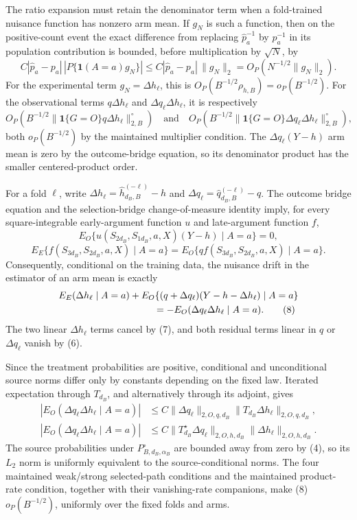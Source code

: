 The ratio expansion must retain the denominator term when a fold-trained nuisance function has nonzero arm mean.  If \(g_N\) is such a function, then on the positive-count event the exact difference from replacing \(\widehat p_a^{-1}\) by \(p_a^{-1}\) in its population contribution is bounded, before multiplication by \(\sqrt N\), by
\[
 C|\widehat p_a-p_a|\,|P\{\mathbf1(A=a)g_N\}|
 \le C|\widehat p_a-p_a|\,\|g_N\|_2
 =O_P(N^{-1/2}\|g_N\|_2). \tag{5a}
\]
For the experimental term \(g_N=\Delta h_\ell\), this is \(O_P(B^{-1/2}\rho_{h,B})=o_P(B^{-1/2})\).  For the observational terms \(q\Delta h_\ell\) and \(\Delta q_\ell\Delta h_\ell\), it is respectively
\[
 O_P\!\left(B^{-1/2}\|\mathbf1\{G=O\}q\Delta h_\ell\|_{2,B}^{\circ}\right)
 \quad\text{and}\quad
 O_P\!\left(B^{-1/2}\|\mathbf1\{G=O\}\Delta q_\ell\Delta h_\ell\|_{2,B}^{\circ}\right), \tag{5b}
\]
both \(o_P(B^{-1/2})\) by the maintained multiplier condition.  The \(\Delta q_\ell(Y-h)\) arm mean is zero by the outcome-bridge equation, so its denominator product has the smaller centered-product order.

For a fold \(\ell\), write \(\Delta h_\ell=\widehat h_{d_B,B}^{(-\ell)}-h\) and \(\Delta q_\ell=\widehat q_{d_B,B}^{(-\ell)}-q\).  The outcome bridge equation and the selection-bridge change-of-measure identity imply, for every square-integrable early-argument function \(u\) and late-argument function \(f\),
\[
 E_O\{u(S_{2d_B},S_{1d_B},a,X)(Y-h)\mid A=a\}=0, \tag{6}
\]
\[
 E_E\{f(S_{3d_B},S_{2d_B},a,X)\mid A=a\}
 =E_O\{q f(S_{3d_B},S_{2d_B},a,X)\mid A=a\}. \tag{7}
\]
Consequently, conditional on the training data, the nuisance drift in the estimator of an arm mean is exactly
\[
\begin{aligned}
 &E_E(\Delta h_\ell\mid A=a)
 +E_O\{(q+\Delta q_\ell)(Y-h-\Delta h_\ell)\mid A=a\}\\
 &\hspace{35mm}=-E_O(\Delta q_\ell\Delta h_\ell\mid A=a). \tag{8}
\end{aligned}
\]
The two linear \(\Delta h_\ell\) terms cancel by (7), and both residual terms linear in \(q\) or \(\Delta q_\ell\) vanish by (6).

Since the treatment probabilities are positive, conditional and unconditional source norms differ only by constants depending on the fixed law.  Iterated expectation through \(T_{d_B}\), and alternatively through its adjoint, gives
\[
\begin{aligned}
 |E_O(\Delta q_\ell\Delta h_\ell\mid A=a)|
 &\le C\|\Delta q_\ell\|_{2,O,q,d_B}
       \|T_{d_B}\Delta h_\ell\|_{2,O,q,d_B},\\
 |E_O(\Delta q_\ell\Delta h_\ell\mid A=a)|
 &\le C\|T_{d_B}^{\star}\Delta q_\ell\|_{2,O,h,d_B}
       \|\Delta h_\ell\|_{2,O,h,d_B}. \tag{9}
\end{aligned}
\]
The source probabilities under \(P_{B,d_B,\alpha_B}^{\circ}\) are bounded away from zero by (4), so its \(L_2\) norm is uniformly equivalent to the source-conditional norms.  The four maintained weak/strong selected-path conditions and the maintained product-rate condition, together with their vanishing-rate companions, make (8) \(o_P(B^{-1/2})\), uniformly over the fixed folds and arms.

